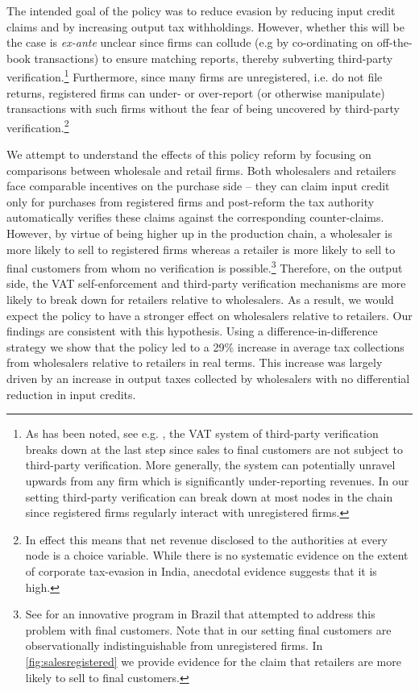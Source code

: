 The intended goal of the policy was to reduce evasion by reducing input credit claims and by increasing output tax withholdings. However, whether this will be the case is \emph{ex-ante} unclear since firms can collude (e.g by co-ordinating on off-the-book transactions) to ensure matching reports, thereby subverting third-party verification.\footnote{As has been noted, see e.g. \cite{pomeranz2015no}, the VAT system of third-party verification breaks down at the last step since sales to final customers are not subject to third-party verification. More generally, the system can potentially unravel upwards from any firm which is significantly under-reporting revenues. In our setting third-party verification can break down at most nodes in the chain since registered firms regularly interact with unregistered firms.} Furthermore, since many firms are unregistered, i.e. do not file returns, registered firms can under- or over-report (or otherwise manipulate) transactions with such firms without the fear of being uncovered by third-party verification.\footnote{In effect this means that net revenue disclosed to the authorities at every node is a choice variable. While there is no systematic evidence on the extent of corporate tax-evasion in India, anecdotal evidence suggests that it is high.}

We attempt to understand the effects of this policy reform by focusing on comparisons between wholesale and retail firms. Both wholesalers and retailers face comparable incentives on the purchase side -- they can claim input credit only for purchases from registered firms and post-reform the tax authority automatically verifies these claims against the corresponding counter-claims. However, by virtue of being higher up in the production chain, a wholesaler is more likely to sell to registered firms whereas a retailer is more likely to sell to final customers from whom no verification is possible.\footnote{See \cite{naritomi2013consumers} for an innovative program in Brazil that attempted to address this problem with final customers. Note that in our setting final customers are observationally indistinguishable from unregistered firms. In \cref{fig:salesregistered} we provide evidence for the claim that retailers are more likely to sell to final customers.} Therefore, on the output side, the VAT self-enforcement and third-party verification mechanisms are more likely to break down for retailers relative to wholesalers. As a result, we would expect the policy to have a stronger effect on wholesalers relative to retailers. Our findings are consistent with this hypothesis. Using a difference-in-difference strategy we show that the policy led to a 29\% increase in average tax collections from wholesalers relative to retailers in real terms. This increase was largely driven by an increase in output taxes collected by wholesalers with no differential reduction in input credits.

